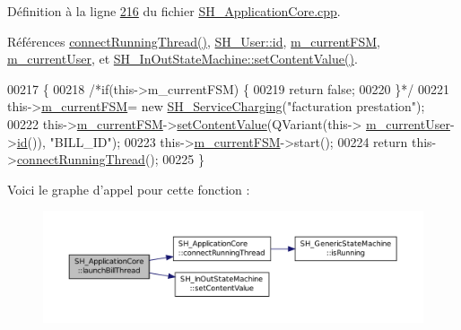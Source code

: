 Définition à la ligne \hyperlink{SH__ApplicationCore_8cpp_source_l00216}{216} du fichier \hyperlink{SH__ApplicationCore_8cpp_source}{S\-H\-\_\-\-Application\-Core.\-cpp}.



Références \hyperlink{classSH__ApplicationCore_a264c6e0c0c2e25a36a2502d1d9bcb109}{connect\-Running\-Thread()}, \hyperlink{classSH__User_a187ee34e1d6d3466f3852e091cdb69e9}{S\-H\-\_\-\-User\-::id}, \hyperlink{classSH__ApplicationCore_a8e550daf4a5d49d88714b716953e4957}{m\-\_\-current\-F\-S\-M}, \hyperlink{classSH__ApplicationCore_a2bd2432939b96af2a1003630df83da63}{m\-\_\-current\-User}, et \hyperlink{classSH__InOutStateMachine_a9ab1534306b2bdb62743d4bcefe40c17}{S\-H\-\_\-\-In\-Out\-State\-Machine\-::set\-Content\-Value()}.


\begin{DoxyCode}
00217 \{
00218     \textcolor{comment}{/*if(this->m\_currentFSM) \{}
00219 \textcolor{comment}{        return false;}
00220 \textcolor{comment}{    \}*/}
00221     this->\hyperlink{classSH__ApplicationCore_a8e550daf4a5d49d88714b716953e4957}{m\_currentFSM}= \textcolor{keyword}{new} \hyperlink{classSH__ServiceCharging}{SH\_ServiceCharging}(\textcolor{stringliteral}{"facturation prestation"});
00222     this->\hyperlink{classSH__ApplicationCore_a8e550daf4a5d49d88714b716953e4957}{m\_currentFSM}->\hyperlink{classSH__InOutStateMachine_a9ab1534306b2bdb62743d4bcefe40c17}{setContentValue}(QVariant(this->
      \hyperlink{classSH__ApplicationCore_a2bd2432939b96af2a1003630df83da63}{m\_currentUser}->\hyperlink{classSH__User_a187ee34e1d6d3466f3852e091cdb69e9}{id}()), \textcolor{stringliteral}{"BILL\_ID"});
00223     this->\hyperlink{classSH__ApplicationCore_a8e550daf4a5d49d88714b716953e4957}{m\_currentFSM}->start();
00224     \textcolor{keywordflow}{return} this->\hyperlink{classSH__ApplicationCore_a264c6e0c0c2e25a36a2502d1d9bcb109}{connectRunningThread}();
00225 \}
\end{DoxyCode}


Voici le graphe d'appel pour cette fonction \-:
\nopagebreak
\begin{figure}[H]
\begin{center}
\leavevmode
\includegraphics[width=350pt]{classSH__ApplicationCore_ab72fd6cdc47575d47157fc7bdffae8f2_cgraph}
\end{center}
\end{figure}


